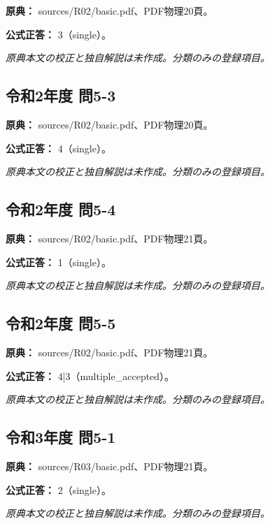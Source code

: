 \noindent\textbf{原典：} sources/R02/basic.pdf、PDF物理20頁。

\textbf{公式正答：} 3（single）。

\par\textit{原典本文の校正と独自解説は未作成。分類のみの登録項目。}

\subsection{令和2年度 問5-3}
\label{q:r02-reg-basic-5-3}

\noindent\textbf{原典：} sources/R02/basic.pdf、PDF物理20頁。

\textbf{公式正答：} 4（single）。

\par\textit{原典本文の校正と独自解説は未作成。分類のみの登録項目。}

\subsection{令和2年度 問5-4}
\label{q:r02-reg-basic-5-4}

\noindent\textbf{原典：} sources/R02/basic.pdf、PDF物理21頁。

\textbf{公式正答：} 1（single）。

\par\textit{原典本文の校正と独自解説は未作成。分類のみの登録項目。}

\subsection{令和2年度 問5-5}
\label{q:r02-reg-basic-5-5}

\noindent\textbf{原典：} sources/R02/basic.pdf、PDF物理21頁。

\textbf{公式正答：} 4|3（multiple\_accepted）。

\par\textit{原典本文の校正と独自解説は未作成。分類のみの登録項目。}

\subsection{令和3年度 問5-1}
\label{q:r03-reg-basic-5-1}

\noindent\textbf{原典：} sources/R03/basic.pdf、PDF物理21頁。

\textbf{公式正答：} 2（single）。

\par\textit{原典本文の校正と独自解説は未作成。分類のみの登録項目。}

